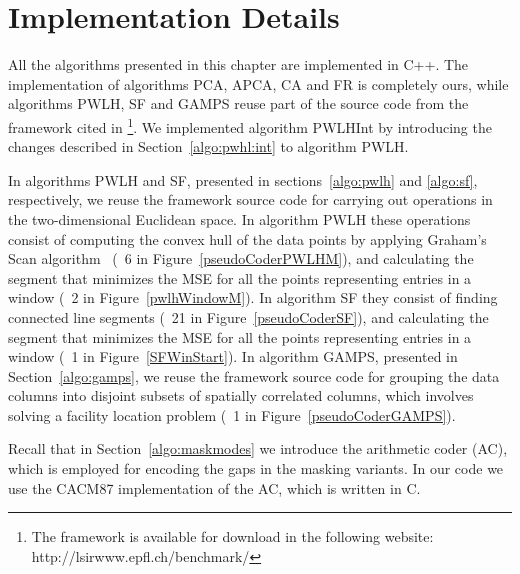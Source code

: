 


\vspace{+10pt}
\section{Implementation Details}
\label{algo:adddetails}


All the algorithms presented in this chapter are implemented in C++. The implementation of algorithms PCA, APCA, CA and FR is completely ours, while algorithms PWLH, SF and GAMPS reuse part of the source code from the framework cited in \cite{AnEva2013}\footnote{The framework is available for download in the following website: http://lsirwww.epfl.ch/benchmark/}. We implemented algorithm PWLHInt by introducing the changes described in Section~\ref{algo:pwhl:int} to algorithm PWLH. 


In algorithms PWLH and SF, presented in sections~\ref{algo:pwlh} and \ref{algo:sf}, respectively, we reuse the framework source code for carrying out operations in the two-dimensional Euclidean space. In algorithm PWLH these operations consist of computing the convex hull of the data points by applying Graham's Scan algorithm~\cite{GrahamAlgo} (\Line~6 in Figure~\ref{pseudoCoderPWLHM}), and calculating the segment that minimizes the MSE for all the points representing entries in a window (\Line~2 in Figure~\ref{pwlhWindowM}). In algorithm SF they consist of finding connected line segments (\Line~21 in Figure~\ref{pseudoCoderSF}), and calculating the segment that minimizes the MSE for all the points representing entries in a window (\Line~1 in Figure~\ref{SFWinStart}). In algorithm GAMPS, presented in Section~\ref{algo:gamps},  we reuse the framework source code for grouping the data columns into disjoint subsets of spatially correlated columns, which involves solving a facility location problem (\Line~1 in Figure~\ref{pseudoCoderGAMPS}).


Recall that in Section~\ref{algo:maskmodes} we introduce the arithmetic coder (AC), which is employed for encoding the gaps in the masking variants. In our code we use the CACM87 implementation \cite{arcodingcomp, ac1} of the AC, which is written in C.

